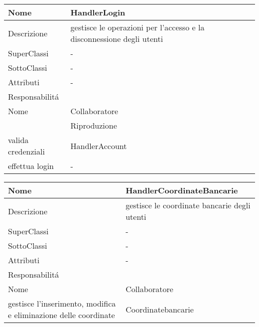 \begin{center} %
    \begin{longtable}{ |p{3cm}|p{3cm}|p{3cm}|p{3cm}| }
        \hline
        Nome & \multicolumn{3}{|p{9cm}|}{HandlerLogin} \\\hline
        Descrizione & \multicolumn{3}{|p{9cm}|}{gestisce le operazioni per l'accesso e la disconnessione degli utenti} \\\hline
        SuperClassi & \multicolumn{3}{|p{9cm}|}{-} \\\hline
        SottoClassi & \multicolumn{3}{|p{9cm}|}{-} \\\hline
        Attributi & \multicolumn{3}{|p{9cm}|}{-} \\\hline
        \multicolumn{4}{|p{12cm}|}{Responsabilit\'a} \\\hline %
        \multicolumn{2}{|p{6cm}|}{Nome} & \multicolumn{2}{|p{6cm}|}{Collaboratore} \\\hline %
        \multicolumn{2}{|p{6cm}|}{} & \multicolumn{2}{|p{6cm}|}{Riproduzione} \\\hline
        \multicolumn{2}{|p{6cm}|}{valida credenziali} & \multicolumn{2}{|p{6cm}|}{HandlerAccount} \\\hline
        \multicolumn{2}{|p{6cm}|}{effettua login} & \multicolumn{2}{|p{6cm}|}{-} \\\hline
        \end{longtable}
\end{center}

\begin{center} %
    \begin{longtable}{ |p{3cm}|p{3cm}|p{3cm}|p{3cm}| }
        \hline
        Nome & \multicolumn{3}{|p{9cm}|}{HandlerCoordinateBancarie} \\\hline
        Descrizione & \multicolumn{3}{|p{9cm}|}{gestisce le coordinate bancarie degli utenti} \\\hline
        SuperClassi & \multicolumn{3}{|p{9cm}|}{-} \\\hline
        SottoClassi & \multicolumn{3}{|p{9cm}|}{-} \\\hline
        Attributi & \multicolumn{3}{|p{9cm}|}{-} \\\hline
        \multicolumn{4}{|p{12cm}|}{Responsabilit\'a} \\\hline %
        \multicolumn{2}{|p{6cm}|}{Nome} & \multicolumn{2}{|p{6cm}|}{Collaboratore} \\\hline %
        \multicolumn{2}{|p{6cm}|}{gestisce l'inserimento, modifica e eliminazione delle coordinate} & \multicolumn{2}{|p{6cm}|}{Coordinatebancarie} \\\hline
        \end{longtable}
\end{center}


